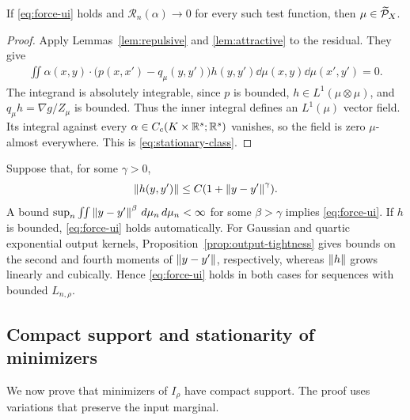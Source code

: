 \begin{proposition}\label{prop:stationarity}
If \eqref{eq:force-ui} holds and $\mathcal R_n(\alpha)\to0$ for every such test function, then $\mu\in\widetilde{\mathcal P}_X$.
\end{proposition}
\begin{proof}
Apply Lemmas~\ref{lem:repulsive} and \ref{lem:attractive} to the residual. They give
\begin{align}
\iint\alpha(x,y)\cdot\bigl(p(x,x')-q_\mu(y,y')\bigr)
h(y,y')\dd\mu(x,y)\dd\mu(x',y')=0.
\end{align}
The integrand is absolutely integrable, since $p$ is bounded, $h\in L^1(\mu\otimes\mu)$, and $q_\mu h=\nabla g/Z_\mu$ is bounded. Thus the inner integral defines an $L^1(\mu)$ vector field. Its integral against every $\alpha\in C_c(K\times\mathbb{R}^s;\mathbb{R}^s)$ vanishes, so the field is zero $\mu$-almost everywhere. This is \eqref{eq:stationary-class}.
\end{proof}

\begin{remark}\label{rem:moment-tests}
Suppose that, for some $\gamma>0$,
\begin{align}
\left\lVert h(y,y')\right\rVert\leq C(1+\left\lVert y-y'\right\rVert^\gamma).\notag
\end{align}
A bound
$\sup_n\iint\left\lVert y-y'\right\rVert^\beta\,d\mu_n\,d\mu_n<\infty$ for some $\beta>\gamma$ implies \eqref{eq:force-ui}. If $h$ is bounded, \eqref{eq:force-ui} holds automatically. For Gaussian and quartic exponential output kernels, Proposition~\ref{prop:output-tightness} gives bounds on the second and fourth moments of $\left\lVert y-y'\right\rVert$, respectively, whereas $\left\lVert h\right\rVert$ grows linearly and cubically. Hence \eqref{eq:force-ui} holds in both cases for sequences with bounded $L_{n,\rho}$.
\end{remark}

\subsection{Compact support and stationarity of minimizers}\label{sec:support-proof}
We now prove that minimizers of $I_\rho$ have compact support. The proof uses variations that preserve the input marginal.


